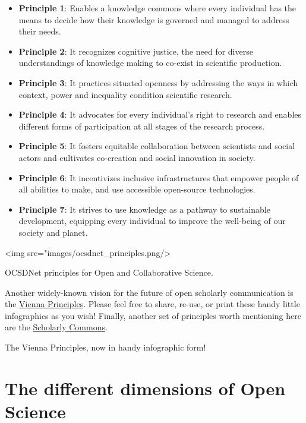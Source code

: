 \documentclass[]{book}
\begin{document}
{{{\begin{itemize}
\item
  \textbf{Principle 1}: Enables a knowledge commons where every individual has the means to decide how their knowledge is governed and managed to address their needs.
\item
  \textbf{Principle 2}: It recognizes cognitive justice, the need for diverse understandings of knowledge making to co-exist in scientific production.
\item
  \textbf{Principle 3}: It practices situated openness by addressing the ways in which context, power and inequality condition scientific research.
\item
  \textbf{Principle 4}: It advocates for every individual's right to research and enables different forms of participation at all stages of the research process.
\item
  \textbf{Principle 5}: It fosters equitable collaboration between scientists and social actors and cultivates co-creation and social innovation in society.
\item
  \textbf{Principle 6}: It incentivizes inclusive infrastructures that empower people of all abilities to make, and use accessible open-source technologies.
\item
  \textbf{Principle 7}: It strives to use knowledge as a pathway to sustainable development, equipping every individual to improve the well-being of our society and planet.
\end{itemize}

\textless{}img src="images/ocsdnet\_principles.png/\textgreater{}

OCSDNet principles for Open and Collaborative Science.

Another widely-known vision for the future of open scholarly communication is the \href{https://viennaprinciples.org/}{Vienna Principles}. Please feel free to share, re-use, or print these handy little infographics as you wish! Finally, another set of principles worth mentioning here are the \href{https://osf.io/6c2xt/}{Scholarly Commons}.

The Vienna Principles, now in handy infographic form!

\hypertarget{the-different-dimensions-of-open-science}{%
\section{The different dimensions of Open Science }\label{the-different-dimensions-of-open-science}}

}}}
\end{document}
